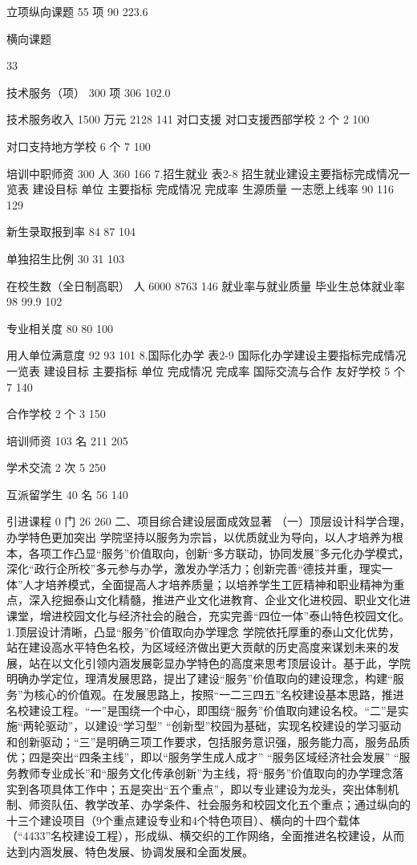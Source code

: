 立项纵向课题
55
项
90
223.6%

横向课题


33


技术服务（项）
300
项
306
102.0%

技术服务收入
1500
万元
2128
141%
对口支援
对口支援西部学校
2
个
2
100%

对口支持地方学校
6
个
7
100%

培训中职师资
300
人
360
166%
7.招生就业
表2-8   招生就业建设主要指标完成情况一览表
建设目标
单位
主要指标
完成情况
完成率
生源质量
一志愿上线率
%
90
116
129

新生录取报到率
%
84
87
104%

单独招生比例
%
30
31
103%

在校生数（全日制高职）
人
6000
8763
146%
就业率与就业质量
毕业生总体就业率
%
98
99.9
102%

专业相关度
%
80
80
100%

用人单位满意度
%
92
93
101%
8.国际化办学
表2-9  国际化办学建设主要指标完成情况一览表
建设目标
主要指标
单位
完成情况
完成率
国际交流与合作
友好学校
5
个
7
140%

合作学校
2
个
3
150%

培训师资
103
名
211
205%

学术交流
2
次
5
250%

互派留学生
40
名
56
140%

引进课程
0
门
26
260%
二、项目综合建设层面成效显著
（一）顶层设计科学合理，办学特色更加突出
学院坚持以服务为宗旨，以优质就业为导向，以人才培养为根本，各项工作凸显“服务”价值取向，创新“多方联动，协同发展”多元化办学模式，深化“政行企所校”多元参与办学，激发办学活力；创新完善“德技并重，理实一体”人才培养模式，全面提高人才培养质量；以培养学生工匠精神和职业精神为重点，深入挖掘泰山文化精髓，推进产业文化进教育、企业文化进校园、职业文化进课堂，增进校园文化与经济社会的融合，充实完善“四位一体”泰山特色校园文化。
1.顶层设计清晰，凸显“服务”价值取向办学理念
学院依托厚重的泰山文化优势，站在建设高水平特色名校，为区域经济做出更大贡献的历史高度来谋划未来的发展，站在以文化引领内涵发展彰显办学特色的高度来思考顶层设计。基于此，学院明确办学定位，理清发展思路，提出了建设“服务”价值取向的建设理念，构建“服务”为核心的价值观。在发展思路上，按照“一二三四五”名校建设基本思路，推进名校建设工程。“一”是围绕一个中心，即围绕“服务”价值取向建设名校。“二”是实施“两轮驱动”，以建设“学习型” “创新型”校园为基础，实现名校建设的学习驱动和创新驱动；“三”是明确三项工作要求，包括服务意识强，服务能力高，服务品质优；四是突出“四条主线”，即以“服务学生成人成才” “服务区域经济社会发展” “服务教师专业成长”和“服务文化传承创新”为主线，将“服务”价值取向的办学理念落实到各项具体工作中；五是突出“五个重点”，即以专业建设为龙头，突出体制机制、师资队伍、教学改革、办学条件、社会服务和校园文化五个重点；通过纵向的十三个建设项目（9个重点建设专业和4个特色项目）、横向的十四个载体（“4433”名校建设工程），形成纵、横交织的工作网络，全面推进名校建设，从而达到内涵发展、特色发展、协调发展和全面发展。











